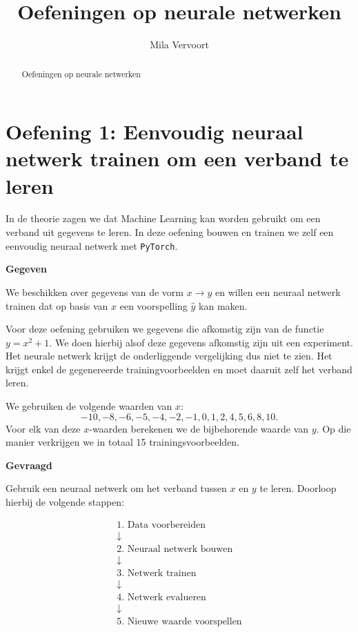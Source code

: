 \documentclass{ximera}
\title{Oefeningen op neurale netwerken}
\author{Mila Vervoort}
\begin{document}
\begin{abstract}
    Oefeningen op neurale netwerken 
\end{abstract}
\maketitle
\label{xim:Oefeningen op neurale netwerken}

\section*{Oefening 1: Eenvoudig neuraal netwerk trainen om een verband te leren}

In de theorie zagen we dat Machine Learning kan worden gebruikt om een verband uit gegevens te leren. In deze oefening bouwen en trainen we
zelf een eenvoudig neuraal netwerk met \texttt{PyTorch}.

\textbf{Gegeven}

We beschikken over gegevens van de vorm $x \longrightarrow y$ en willen een neuraal netwerk trainen dat op basis van $x$ een voorspelling $\hat y$ kan maken.

Voor deze oefening gebruiken we gegevens die afkomstig zijn van de functie $y=x^2+1.$ We doen hierbij alsof deze gegevens afkomstig zijn uit een experiment. Het neurale netwerk krijgt de onderliggende vergelijking dus niet te zien.
Het krijgt enkel de gegenereerde trainingvoorbeelden en moet daaruit zelf het verband leren.

We gebruiken de volgende waarden van $x$:
\[
-10,-8,-6,-5,-4,-2,-1,0,1,2,4,5,6,8,10.
\]
Voor elk van deze $x$-waarden berekenen we de bijbehorende waarde van $y$. Op die manier verkrijgen we in totaal 15 trainingsvoorbeelden.

\textbf{Gevraagd}

Gebruik een neuraal netwerk om het verband tussen $x$ en $y$ te leren.
Doorloop hierbij de volgende stappen:

\[
\boxed{
\begin{array}{c}
\text{1. Data voorbereiden}\\
\downarrow\\
\text{2. Neuraal netwerk bouwen}\\
\downarrow\\
\text{3. Netwerk trainen}\\
\downarrow\\
\text{4. Netwerk evalueren}\\
\downarrow\\
\text{5. Nieuwe waarde voorspellen}
\end{array}
}
\]
\end{document}
